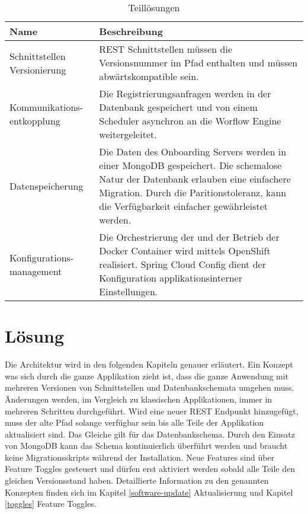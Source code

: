 \begin{table}[H]
	\centering
	\caption{Teillösungen}
	\begin{tabular}{ | p{4cm} | p{11cm} | }
		\toprule
		{\textbf{Name}} & {\textbf{Beschreibung}} \\
		\midrule
		Schnittstellen Versionierung & REST Schnittstellen müssen die Versionsnummer im Pfad enthalten und müssen abwärtskompatible sein.\\ \hline
		Kommunikations- entkopplung &  Die Registrierungsanfragen werden in der Datenbank gespeichert und von einem Scheduler asynchron an die Worflow Engine weitergeleitet.\\ \hline
		Datenspeicherung & Die Daten des Onboarding Servers werden in einer MongoDB gespeichert. Die schemalose Natur der Datenbank erlauben eine einfachere Migration. Durch die Paritionstoleranz, kann die Verfügbarkeit einfacher gewährleistet werden.\\ \hline
		Konfigurations- management &  Die Orchestrierung der und der Betrieb der Docker Container wird mittels OpenShift realisiert. Spring Cloud Config dient der Konfiguration applikationsinterner Einstellungen.\\
		\bottomrule
	\end{tabular}
\end{table}

\section{Lösung}

Die Architektur wird in den folgenden Kapiteln genauer erläutert. Ein Konzept was sich durch die ganze Applikation zieht ist, dass die ganze Anwendung mit mehreren Versionen von Schnittstellen und Datenbankschemata umgehen muss. Änderungen werden, im Vergleich zu klassischen Applikationen, immer in mehreren Schritten durchgeführt. Wird eine neuer REST Endpunkt hinzugefügt, muss der alte Pfad solange verfügbar sein bis alle Teile der Applikation aktualisiert sind. Das Gleiche gilt für das Datenbankschema. Durch den Einsatz von MongoDB kann das Schema kontinuierlich überführt werden und braucht keine Migrationsskripts während der Installation. Neue Features sind über Feature Toggles gesteuert und dürfen erst aktiviert werden sobald alle Teile den gleichen Versionsstand haben. Detaillierte Information zu den genannten Konzepten finden sich im Kapitel \ref{software-update} Aktualisierung und Kapitel \ref{toggles} Feature Toggles.
\newpage